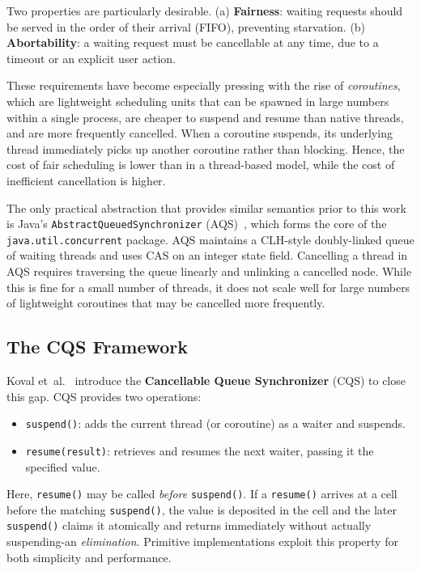 \documentclass[11pt,a4paper]{article}
\begin{document}
Two properties are particularly desirable.
(a) \textbf{Fairness}: waiting requests should be served in the order
of their arrival (FIFO), preventing starvation.
(b) \textbf{Abortability}: a waiting request must be cancellable at
        any time, due to a timeout or an explicit user action.

These requirements have become especially pressing with the rise of
\emph{coroutines}, which are lightweight scheduling units that can be
spawned in large numbers within a single process, are cheaper to suspend
and resume than native threads, and are more frequently cancelled. When a
coroutine suspends, its underlying thread immediately picks up another
coroutine rather than blocking. Hence, the cost of fair scheduling is
lower than in a thread-based model, while the cost of inefficient
cancellation is higher.

The only practical abstraction that provides similar semantics prior to
this work is Java's \texttt{AbstractQueuedSynchronizer}
(AQS)~\cite{lea2005aqs}, which forms the core of the
\texttt{java.util.concurrent} package. AQS maintains a CLH-style
doubly-linked queue of waiting threads and uses CAS on an integer state
field. Cancelling a thread in AQS requires traversing the queue linearly
and unlinking a cancelled node. While this is fine for a small number of
threads, it does not scale well for large numbers of lightweight
coroutines that may be cancelled more frequently.

\subsection{The CQS Framework}
\label{sec:bg-cqs}

Koval et~al.~\cite{koval2023cqs} introduce the \textbf{Cancellable Queue
Synchronizer} (CQS) to close this gap. CQS provides two operations:
\begin{itemize}[leftmargin=1.5em,nosep]
  \item \texttt{suspend()}: adds the current thread (or coroutine) as a
        waiter and suspends.
  \item \texttt{resume(result)}: retrieves and resumes the next waiter,
        passing it the specified value.
\end{itemize}

Here, \texttt{resume()} may be called \emph{before} \texttt{suspend()}.
If a \texttt{resume()} arrives at a cell before the matching
\texttt{suspend()}, the value is deposited in the cell and the later
\texttt{suspend()} claims it atomically and returns immediately without
actually suspending-an \emph{elimination}. Primitive implementations
exploit this property for both simplicity and performance.
\end{document}
